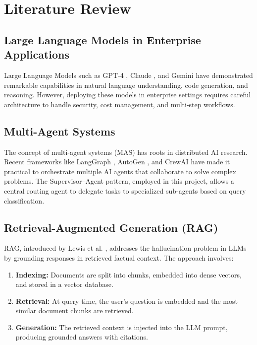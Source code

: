 \documentclass[12pt, a4paper]{report}
\begin{document}
\chapter{Literature Review}

\section{Large Language Models in Enterprise Applications}

Large Language Models such as GPT-4 \cite{openai2023gpt4}, Claude \cite{anthropic2024claude}, and Gemini \cite{google2024gemini} have demonstrated remarkable capabilities in natural language understanding, code generation, and reasoning. However, deploying these models in enterprise settings requires careful architecture to handle security, cost management, and multi-step workflows.

\section{Multi-Agent Systems}

The concept of multi-agent systems (MAS) has roots in distributed AI research. Recent frameworks like LangGraph \cite{langgraph2024}, AutoGen \cite{wu2023autogen}, and CrewAI \cite{crewai2024} have made it practical to orchestrate multiple AI agents that collaborate to solve complex problems. The Supervisor--Agent pattern, employed in this project, allows a central routing agent to delegate tasks to specialized sub-agents based on query classification.

\section{Retrieval-Augmented Generation (RAG)}

RAG, introduced by Lewis et al. \cite{lewis2020rag}, addresses the hallucination problem in LLMs by grounding responses in retrieved factual context. The approach involves:
\begin{enumerate}
    \item \textbf{Indexing:} Documents are split into chunks, embedded into dense vectors, and stored in a vector database.
    \item \textbf{Retrieval:} At query time, the user's question is embedded and the most similar document chunks are retrieved.
    \item \textbf{Generation:} The retrieved context is injected into the LLM prompt, producing grounded answers with citations.
\end{enumerate}
\end{document}

